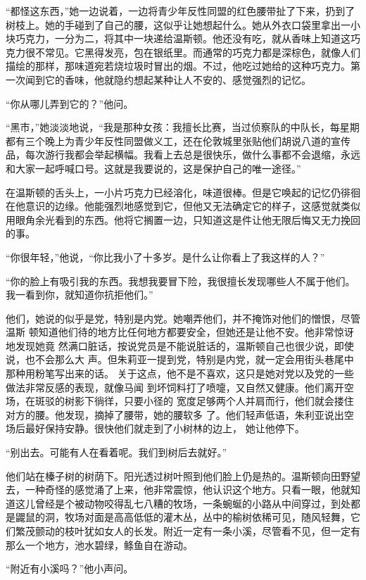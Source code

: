 ``都怪这东西，''她一边说着，一边将青少年反性同盟的红色腰带扯了下来，扔到了树枝上。她的手碰到了自己的腰，这似乎让她想起什么。她从外衣口袋里拿出一小块巧克力，一分为二，将其中一块递给温斯顿。他还没有吃，就从香味上知道这巧克力很不常见。它黑得发亮，包在银纸里。而通常的巧克力都是深棕色，就像人们描绘的那样，那味道宛若烧垃圾时冒出的烟。不过，他吃过她给的这种巧克力。第一次闻到它的香味，他就隐约想起某种让人不安的、感觉强烈的记忆。

``你从哪儿弄到它的？''他问。

``黑市，''她淡淡地说，``我是那种女孩：我擅长比赛，当过侦察队的中队长，每星期都有三个晚上为青少年反性同盟做义工，还在伦敦城里张贴他们胡说八道的宣传品，每次游行我都会举起横幅。我看上去总是很快乐，做什么事都不会退缩，永远和大家一起呼喊口号。这就是我要说的，这是保护自己的唯一途径。''

在温斯顿的舌头上，一小片巧克力已经溶化，味道很棒。但是它唤起的记忆仍徘徊在他意识的边缘。他能强烈地感觉到它，但他又无法确定它的样子，这感觉就类似用眼角余光看到的东西。他将它搁置一边，只知道这是件让他无限后悔又无力挽回的事。

``你很年轻，''他说，``你比我小了十多岁。是什么让你看上了我这样的人？''

``你的脸上有吸引我的东西。我想我要冒下险，我很擅长发现哪些人不属于他们。我一看到你，就知道你抗拒他们。''

他们，她说的似乎是党，特别是内党。她嘲弄他们，并不掩饰对他们的憎恨，尽管温斯
顿知道他们待的地方比任何地方都要安全，但她还是让他不安。他非常惊讶地发现她竟
然满口脏话，按说党员是不能说脏话的，温斯顿自己也很少说，即使说，也不会那么大
声。但朱莉亚一提到党，特别是内党，就一定会用街头巷尾中那种用粉笔写出来的话。
关于这点，他不是不喜欢，这只是她对党以及党的一些做法非常反感的表现，就像马闻
到坏饲料打了喷嚏，又自然又健康。他们离开空场，在斑驳的树影下徜徉，只要小径的
宽度足够两个人并肩而行，他们就会搂住对方的腰。他发现，摘掉了腰带，她的腰软多
了。他们轻声低语，朱利亚说出空场后最好保持安静。很快他们就走到了小树林的边上，
她让他停下。

``别出去。可能有人在看着呢。我们到树后去就好。''

他们站在榛子树的树荫下。阳光透过树叶照到他们脸上仍是热的。温斯顿向田野望去，一种奇怪的感觉涌了上来，他非常震惊，他认识这个地方。只看一眼，他就知道这儿曾经是个被动物咬得乱七八糟的牧场，一条蜿蜒的小路从中间穿过，到处都是鼹鼠的洞，牧场对面是高高低低的灌木丛，丛中的榆树依稀可见，随风轻舞，它们繁茂颤动的枝叶犹如女人的长发。附近一定有一条小溪，尽管看不见，但一定有那么一个地方，池水碧绿，鲦鱼自在游动。

``附近有小溪吗？''他小声问。

